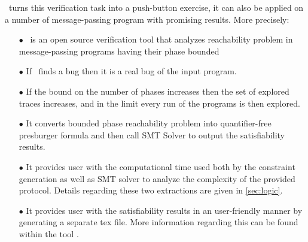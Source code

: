 \MPass\ turns this verification task into a push-button exercise,   it can also  be  applied on a number of message-passing program with promising results. More precisely:



\begin{enumerate}
\item[$\bullet$] \MPass\ is an open source \cite{github.MPass}
  verification tool that analyzes reachability problem in message-passing programs having their phase bounded
\item[$\bullet$] If \MPass\ finds a bug then it is a real bug of the input program.

\item[$\bullet$] If the bound on the number of phases increases  then the set of explored traces increases, and in the limit every run of the programs is then explored.   
\item[$\bullet$] It converts bounded phase reachability problem into quantifier-free presburger formula and then call 
  SMT Solver to output the satisfiability results.
  
\item[$\bullet$] It provides user with the computational time used both by the constraint generation as well as 
  SMT solver to analyze the complexity of the provided protocol. Details regarding these two extractions are given in \cref{sec:logic}.
\item[$\bullet$] It provides user with the satisfiability results in an user-friendly manner by generating a separate tex file.
  More information regarding this can be found within the tool \cite{github.MPass}.
\end{enumerate}

